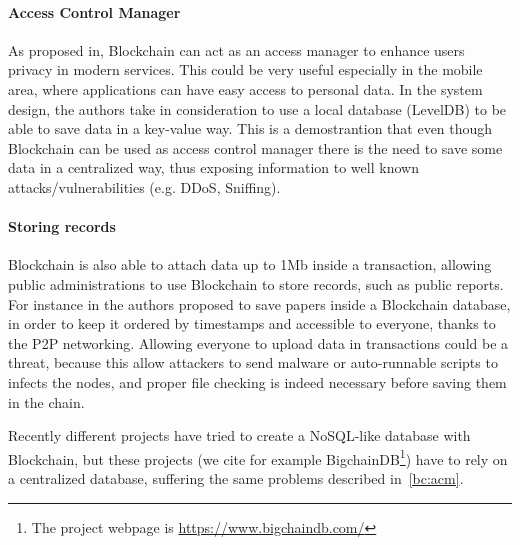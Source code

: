 \paragraph*{Access Control Manager}
\label{bc:acm}

As proposed in\cite{dp15}, Blockchain can act as an access manager to enhance
users privacy in modern services. This could be very useful especially in the
mobile area, where applications can have easy access to personal data. In the
system design, the authors take in consideration to use a local database
(LevelDB) to be able to save data in a key-value way. This is a demostrantion
that even though Blockchain can be used as access control manager there is the
need to save some data in a centralized way, thus exposing information to
well known attacks/vulnerabilities (e.g. DDoS, Sniffing).

\paragraph*{Storing records}

Blockchain is also able to attach data up to 1Mb \cite{ectel16} inside a
transaction, allowing public administrations to use Blockchain to store
records, such as public reports. For instance in\cite{ectel16} the authors
proposed to save papers inside a Blockchain database, in order to keep it
ordered by timestamps and accessible to everyone, thanks to the P2P networking.
Allowing everyone to upload data in transactions could be a threat, because this
allow attackers to send malware or auto-runnable scripts to infects the nodes,
and proper file checking is indeed necessary before saving them in the chain.


Recently different projects have tried to create a NoSQL-like database with
Blockchain, but these projects (we cite for example BigchainDB\footnote{The
project webpage is \url{https://www.bigchaindb.com/}}) have to rely on a
centralized database, suffering the same problems described in~\ref{bc:acm}.
